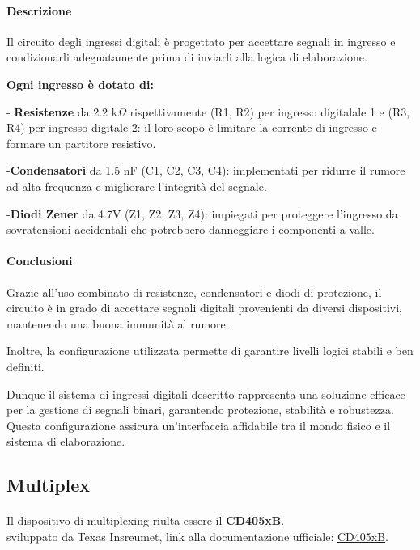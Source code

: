 \documentclass[12pt,a4paper]{report}
\begin{document}
\paragraph{Descrizione}
Il circuito degli ingressi digitali è progettato per accettare segnali in ingresso e condizionarli adeguatamente prima di inviarli alla logica di elaborazione. 

\textbf{Ogni ingresso è dotato di:}

- \textbf{Resistenze} da 2.2 k$\Omega$
 rispettivamente (R1, R2) per ingresso digitalale 1 e (R3, R4) per ingresso digitale 2: 
il loro scopo è limitare la corrente di ingresso e formare un partitore resistivo.

-\textbf{Condensatori} da 1.5 nF (C1, C2, C3, C4): 
implementati per ridurre il rumore ad alta frequenza e migliorare l'integrità del segnale.

-\textbf{Diodi Zener} da 4.7V (Z1, Z2, Z3, Z4): impiegati per proteggere l'ingresso da sovratensioni accidentali che potrebbero danneggiare i componenti a valle.

\paragraph{Conclusioni}

Grazie all'uso combinato di resistenze, condensatori e diodi di protezione, il circuito è in grado di accettare segnali digitali provenienti da diversi dispositivi, mantenendo una buona immunità al rumore. 

Inoltre, la configurazione utilizzata permette di garantire livelli logici stabili e ben definiti.

Dunque il sistema di ingressi digitali descritto rappresenta una soluzione efficace per la gestione di segnali binari, garantendo protezione, stabilità e robustezza. Questa configurazione assicura un'interfaccia affidabile tra il mondo fisico e il sistema di elaborazione.

\newpage
\subsection{Multiplex}
\paragraph{ }
Il dispositivo di multiplexing riulta essere il \textbf{CD405xB}. \\
sviluppato da Texas Insreumet, link alla documentazione ufficiale: \href{https://www.ti.com/lit/ds/symlink/cd4051b.pdf}{CD405xB}. \\ 
\end{document}
